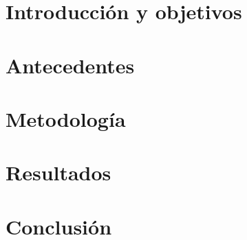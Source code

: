\documentclass[12pt,dvipsnames,a4paper,twoside]{article}
\begin{document}
% 


\newpage
\section{Introducción y objetivos}




\newpage
\section{Antecedentes}



\newpage
\section{Metodología}




\newpage
\section{Resultados}




\newpage
\section{Conclusión}
\end{document}
